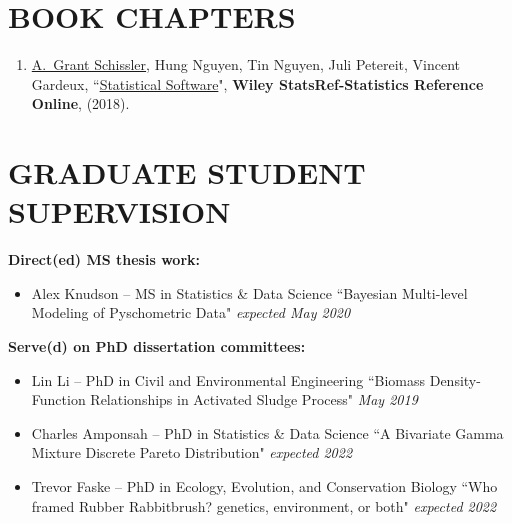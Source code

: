 \documentclass[paper=a4,fontsize=11pt]{scrartcl} %
\newcommand{\NewPart}[2]{\section*{\uppercase{#1} #2 }}
\newcommand{\PaperEntry}[7]{
		\noindent #1, ``\href{#7}{#2}", \textit{#3} \textbf{#4}, #5 (#6).}
\newcommand{\ThesisEntry}[5]{
		\noindent #1 -- #2 #3 ``#4" \textit{#5}}
\begin{document}
\NewPart{Book chapters}{}
\vspace{-7pt}
\begin{enumerate}


 \item \PaperEntry{\underline{A.~Grant Schissler}, Hung Nguyen, Tin Nguyen, Juli Petereit, Vincent Gardeux}{Statistical Software}{}{Wiley StatsRef-Statistics Reference Online}{}{2018}{}
   
\end{enumerate}



\NewPart{Graduate student supervision}{}
\vspace{7pt}


\noindent \textbf{Direct(ed) MS thesis work:}

\begin{itemize}[noitemsep]

  \item \ThesisEntry{Alex Knudson}{MS in Statistics \& Data Science}{}{Bayesian Multi-level Modeling of Pyschometric Data}{expected May 2020}

  \end{itemize}

\noindent \textbf{Serve(d) on PhD dissertation committees:}
  
\begin{itemize}[noitemsep]

        \item \ThesisEntry{Lin Li}{PhD in Civil and Environmental Engineering}{}{Biomass Density-Function Relationships in Activated Sludge Process}{May 2019}

\item \ThesisEntry{Charles Amponsah}{PhD in Statistics \& Data Science}{}{A Bivariate Gamma Mixture Discrete Pareto Distribution}{expected 2022}
    
  \item \ThesisEntry{Trevor Faske}{PhD in Ecology, Evolution, and Conservation Biology}{}{Who framed Rubber Rabbitbrush? genetics, environment, or both}{expected 2022}

  \end{itemize}
  
\end{document}
